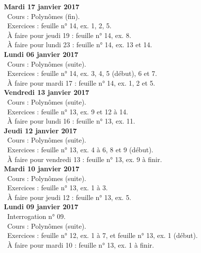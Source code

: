 \documentclass[12pt,a4paper]{article}
\begin{document}
\noindent\textbf{Mardi 17 janvier 2017}\\
\bu\ Cours : Polynômes (fin).\\
\bu\ Exercices : feuille n° 14, ex. 1, 2, 5.\\
\bu\ À faire pour jeudi 19 : feuille n° 14, ex. 8.\\  
\bu\ À faire pour lundi 23 : feuille n° 14, ex. 13 et 14.\vspace{.4cm}\\  
 
\noindent\textbf{ Lundi 06 janvier 2017}\\
\bu\ Cours : Polynômes (suite).\\
\bu\ Exercices : feuille n° 14, ex. 3, 4, 5 (début), 6 et 7.\\
\bu\ À faire pour mardi 17 : feuille n° 14, ex. 1, 2 et 5.\vspace{.4cm}\\  

\noindent\textbf{Vendredi 13 janvier 2017}\\
\bu\ Cours : Polynômes (suite).\\
\bu\ Exercices : feuille n° 13, ex. 9 et 12 à 14.\\
\bu\ À faire pour lundi 16 : feuille n° 13, ex. 11.\vspace{.4cm}\\

\noindent\textbf{Jeudi 12 janvier 2017}\\
\bu\ Cours : Polynômes (suite).\\
\bu\ Exercices : feuille n° 13, ex. 4 à 6, 8 et 9 (début).\\
\bu\ À faire pour vendredi 13 : feuille n° 13, ex. 9 à finir.\vspace{.4cm}\\

\noindent\textbf{Mardi 10 janvier 2017} \\
\bu\ Cours : Polynômes (suite).\\
\bu\ Exercices : feuille n° 13, ex. 1 à 3.\\
\bu\ À faire pour jeudi 12 : feuille n° 13, ex. 5.\vspace{.4cm}\\
 
\noindent\textbf{ Lundi 09 janvier 2017} \\
\bu\ Interrogation n° 09.\\
\bu\ Cours : Polynômes (suite).\\
\bu\ Exercices : feuille n° 12, ex. 1 à 7, et feuille n° 13, ex. 1 (début).\\
\bu\ À faire pour mardi 10 : feuille n° 13, ex. 1 à finir.\vspace{.4cm}\\
\end{document}
